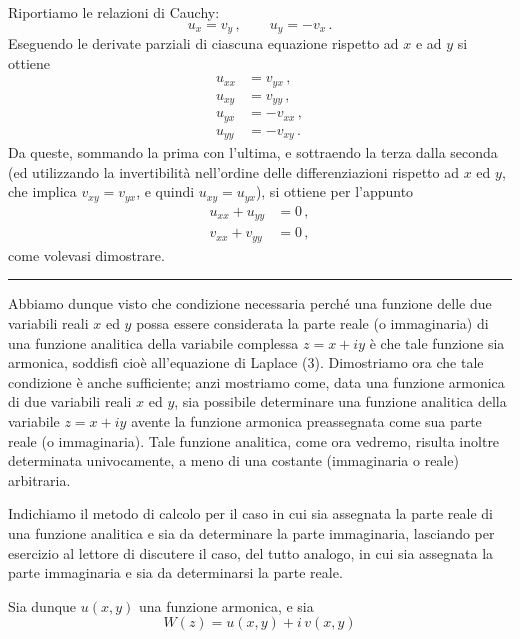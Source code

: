 \documentclass[11pt, a4paper]{book}
\numberwithin{equation}{section}
\begin{document}
Riportiamo le relazioni di Cauchy:
\[
u_x = v_y\,, \qquad u_y = -v_x\,.
\]
Eseguendo le derivate parziali di ciascuna equazione rispetto ad $x$ e ad $y$ si ottiene
\begin{align*}
u_{xx} &= v_{yx}\,, \\
u_{xy} &= v_{yy}\,, \\
u_{yx} &= -v_{xx}\,, \\
u_{yy} &= -v_{xy}\,.
\end{align*}
Da queste, sommando la prima con l'ultima, e sottraendo la terza dalla seconda (ed utilizzando la invertibilità nell'ordine delle differenziazioni rispetto ad $x$ ed $y$, che implica $v_{xy} = v_{yx}$, e quindi $u_{xy} = u_{yx}$), si ottiene per l'appunto
\begin{align*}
u_{xx} + u_{yy} &= 0\,, \\
v_{xx} + v_{yy} &= 0\,,
\end{align*}
come volevasi dimostrare.

\noindent\rule{\linewidth}{0.4pt}

Abbiamo dunque visto che condizione necessaria perché una funzione delle due variabili reali $x$ ed $y$ possa essere considerata la parte reale (o immaginaria) di una funzione analitica della variabile complessa $z = x + iy$ è che tale funzione sia armonica, soddisfi cioè all'equazione di Laplace (3). Dimostriamo ora che tale condizione è anche sufficiente; anzi mostriamo come, data una funzione armonica di due variabili reali $x$ ed $y$, sia possibile determinare una funzione analitica della variabile $z = x + iy$ avente la funzione armonica preassegnata come sua parte reale (o immaginaria). Tale funzione analitica, come ora vedremo, risulta inoltre determinata univocamente, a meno di una costante (immaginaria o reale) arbitraria.

Indichiamo il metodo di calcolo per il caso in cui sia assegnata la parte reale di una funzione analitica e sia da determinare la parte immaginaria, lasciando per esercizio al lettore di discutere il caso, del tutto analogo, in cui sia assegnata la parte immaginaria e sia da determinarsi la parte reale.

Sia dunque $u(x,y)$ una funzione armonica, e sia
\begin{equation}
W(z) = u(x,y) + i\,v(x,y) \tag{7}
\end{equation}

\end{document}
